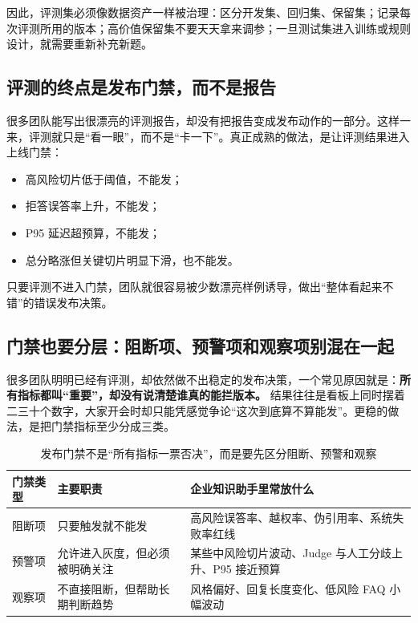 因此，评测集必须像数据资产一样被治理：区分开发集、回归集、保留集；记录每次评测所用的版本；高价值保留集不要天天拿来调参；一旦测试集进入训练或规则设计，就需要重新补充新题。

\subsection{评测的终点是发布门禁，而不是报告}
很多团队能写出很漂亮的评测报告，却没有把报告变成发布动作的一部分。这样一来，评测就只是“看一眼”，而不是“卡一下”。真正成熟的做法，是让评测结果进入上线门禁：
\begin{itemize}
  \item 高风险切片低于阈值，不能发；
  \item 拒答误答率上升，不能发；
  \item P95 延迟超预算，不能发；
  \item 总分略涨但关键切片明显下滑，也不能发。
\end{itemize}

只要评测不进入门禁，团队就很容易被少数漂亮样例诱导，做出“整体看起来不错”的错误发布决策。

\subsection{门禁也要分层：阻断项、预警项和观察项别混在一起}
很多团队明明已经有评测，却依然做不出稳定的发布决策，一个常见原因就是：\textbf{所有指标都叫“重要”，却没有说清楚谁真的能拦版本。} 结果往往是看板上同时摆着二三十个数字，大家开会时却只能凭感觉争论“这次到底算不算能发”。更稳的做法，是把门禁指标至少分成三类。

\begin{table}[H]
\centering
\small
\begin{tabularx}{\textwidth}{>{\raggedright\arraybackslash}p{2.6cm}>{\raggedright\arraybackslash}p{3cm}>{\raggedright\arraybackslash}X}
\toprule
\textbf{门禁类型} & \textbf{主要职责} & \textbf{企业知识助手里常放什么} \\
\midrule
阻断项 & 只要触发就不能发 & 高风险误答率、越权率、伪引用率、系统失败率红线 \\
预警项 & 允许进入灰度，但必须被明确关注 & 某些中风险切片波动、Judge 与人工分歧上升、P95 接近预算 \\
观察项 & 不直接阻断，但帮助长期判断趋势 & 风格偏好、回复长度变化、低风险 FAQ 小幅波动 \\
\bottomrule
\end{tabularx}
\caption{发布门禁不是“所有指标一票否决”，而是要先区分阻断、预警和观察}
\label{tab:gate-tiers}
\end{table}


